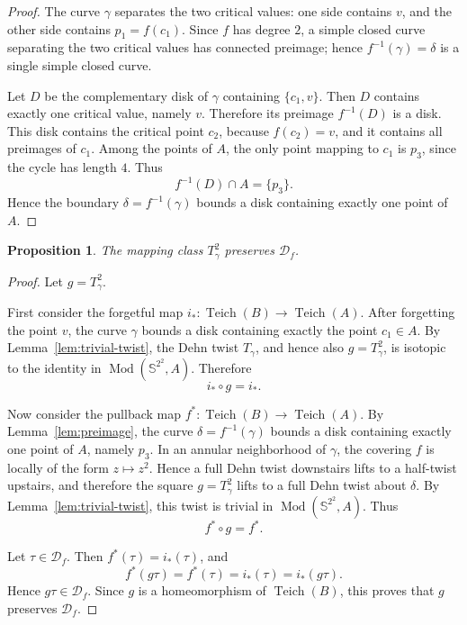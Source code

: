 \documentclass{article}
\newtheorem{proposition}{Proposition}
\DeclareMathOperator{\Teich}{Teich}
\DeclareMathOperator{\Mod}{Mod}
\newcommand{\Sph}{\mathbb{S}^2}
\newcommand{\Dcal}{\mathcal{D}}
\begin{document}
\begin{proof}
The curve $\gamma$ separates the two critical values: one side contains
$v$, and the other side contains $p_1=f(c_1)$. Since $f$ has degree $2$,
a simple closed curve separating the two critical values has connected
preimage; hence $f^{-1}(\gamma)=\delta$ is a single simple closed curve.

Let $D$ be the complementary disk of $\gamma$ containing $\{c_1,v\}$.
Then $D$ contains exactly one critical value, namely $v$. Therefore its
preimage $f^{-1}(D)$ is a disk. This disk contains the critical point
$c_2$, because $f(c_2)=v$, and it contains all preimages of $c_1$.
Among the points of $A$, the only point mapping to $c_1$ is $p_3$, since
the cycle has length $4$. Thus
\[
f^{-1}(D)\cap A=\{p_3\}.
\]
Hence the boundary $\delta=f^{-1}(\gamma)$ bounds a disk containing
exactly one point of $A$.
\end{proof}

\begin{proposition}
\label{prop:preserves}
The mapping class $T_\gamma^2$ preserves $\Dcal_f$.
\end{proposition}

\begin{proof}
Let $g=T_\gamma^2$.

First consider the forgetful map $i_*:\Teich(B)\to \Teich(A)$.
After forgetting the point $v$, the curve $\gamma$ bounds a disk
containing exactly the point $c_1\in A$. By Lemma~\ref{lem:trivial-twist},
the Dehn twist $T_\gamma$, and hence also $g=T_\gamma^2$, is isotopic
to the identity in $\Mod(\Sph^2,A)$. Therefore
\[
i_*\circ g=i_*.
\]

Now consider the pullback map $f^*:\Teich(B)\to \Teich(A)$. By
Lemma~\ref{lem:preimage}, the curve $\delta=f^{-1}(\gamma)$ bounds a disk
containing exactly one point of $A$, namely $p_3$. In an annular
neighborhood of $\gamma$, the covering $f$ is locally of the form
$z\mapsto z^2$. Hence a full Dehn twist downstairs lifts to a half-twist
upstairs, and therefore the square $g=T_\gamma^2$ lifts to a full Dehn
twist about $\delta$. By Lemma~\ref{lem:trivial-twist}, this twist is
trivial in $\Mod(\Sph^2,A)$. Thus
\[
f^*\circ g=f^*.
\]

Let $\tau\in\Dcal_f$. Then $f^*(\tau)=i_*(\tau)$, and
\[
f^*(g\tau)=f^*(\tau)=i_*(\tau)=i_*(g\tau).
\]
Hence $g\tau\in\Dcal_f$. Since $g$ is a homeomorphism of $\Teich(B)$,
this proves that $g$ preserves $\Dcal_f$.
\end{proof}
\end{document}
